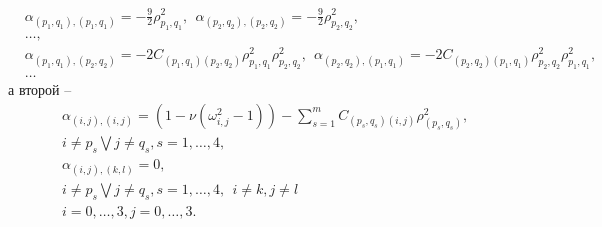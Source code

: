 \documentclass[12pt]{article}  %
\begin{document}
\begin{equation}
\begin{split}
&\alpha_{(p_1,q_1),(p_1,q_1)} = -\frac{9}{2}\rho^2_{p_1,q_1}, \ \ \alpha_{(p_2,q_2),(p_2,q_2)} = -\frac{9}{2}\rho^2_{p_2,q_2},\\
&\dots,\\
&\alpha_{(p_1,q_1),(p_2,q_2)} = - 2C_{(p_1,q_1)(p_2,q_2)}\rho^2_{p_1,q_1}\rho^2_{p_2,q_2}, \ \ \alpha_{(p_2,q_2),(p_1,q_1)} = - 2C_{(p_2,q_2)(p_1,q_1)}\rho^2_{p_2,q_2}\rho^2_{p_1,q_1},\\
&\dots
\end{split}
\end{equation}
а второй \---
\begin{equation}
\begin{split}
&\alpha_{(i,j),(i,j)} = (1-\nu(\omega^2_{i,j}-1)) - \sum_{s=1}^{m}C_{(p_s,q_s)(i,j)}\rho^2_{(p_s,q_s)}, \\
&i\not=p_s \bigvee j\not=q_s, s=1,\dots,4,\\
&\alpha_{(i,j),(k,l)}=0,\\
&i\not=p_s \bigvee j\not=q_s, s=1,\dots,4, \ \ i\not=k, j\not=l\\
&i=0,\dots,3,j=0,\dots,3.
\end{split}
\end{equation}
\end{document}
